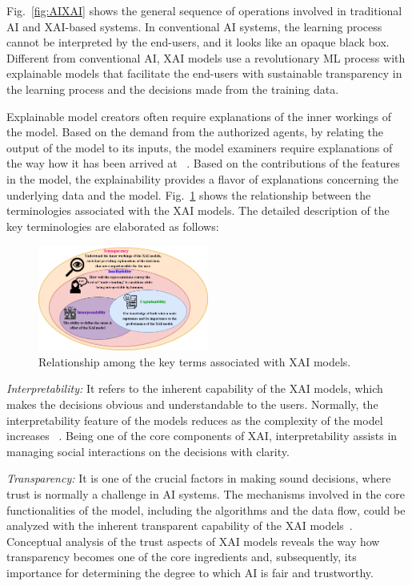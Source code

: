 \documentclass[journal]{IEEEtran}
\begin{document}
Fig.~\ref{fig:AIXAI} shows the general sequence of operations involved in traditional AI and XAI-based systems. In conventional AI systems, the learning process cannot be interpreted by the end-users, and it looks like an opaque black box. Different from conventional AI, XAI models use a revolutionary ML process with explainable models that facilitate the end-users with sustainable transparency in the learning process and the decisions made from the training data. 

Explainable model creators often require explanations of the inner workings of the model. Based on the demand from the authorized agents, by relating the output of the model to its inputs, the model examiners require explanations of the way how it has been arrived at ~\cite{meske2021explainable}. Based on the contributions of the features in the model, the explainability provides a flavor of explanations concerning the underlying data and the model. Fig.~\ref{fig:Expterms} shows the relationship between the terminologies associated with the XAI models. The detailed description of the key terminologies are elaborated as follows: 

\begin{figure}
  \centering \includegraphics[width=0.5\textwidth]{figures/Explainability.png}
   \caption{Relationship among the key terms associated with XAI models.}
   \label{fig:Expterms}
\end{figure}

\textit{Interpretability:} It refers to the inherent capability of the XAI models, which makes the decisions obvious and understandable to the users. Normally, the interpretability feature of the models reduces as the complexity of the model increases ~\cite{dikshit2021interpretable}. Being one of the core components of XAI, interpretability assists in managing social interactions on the decisions with clarity.

\textit{Transparency:} It is one of the crucial factors in making sound decisions, where trust is normally a challenge in AI systems. The mechanisms involved in the core functionalities of the model, including the algorithms and the data flow, could be analyzed with the inherent transparent capability of the XAI models~\cite{von2021transparency}. Conceptual analysis of the trust aspects of XAI models reveals the way how transparency becomes one of the core ingredients and, subsequently, its importance for determining the degree to which AI is fair and trustworthy. 
\end{document}
